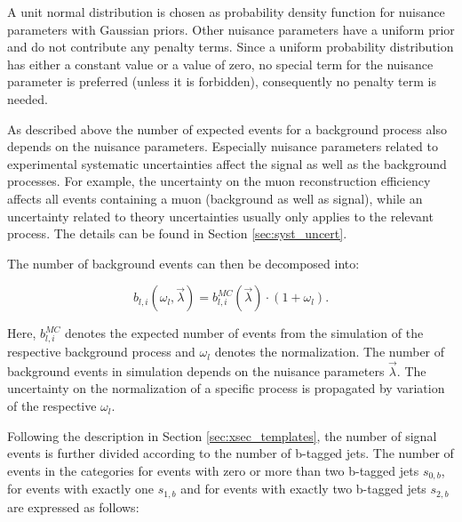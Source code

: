 A unit normal distribution is chosen as probability density function for nuisance parameters with Gaussian priors. Other nuisance parameters have a uniform prior and do not contribute any penalty terms. 
Since a uniform probability distribution has either a constant value or a value of zero, no special term for the nuisance parameter is preferred (unless it is forbidden), consequently no penalty term is needed. 

As described above the number of expected events for a background process also depends on the nuisance parameters. Especially nuisance parameters related to experimental systematic uncertainties affect the signal as well as the background processes. For example, the uncertainty on the muon reconstruction efficiency affects all events containing a muon (background as well as signal), while an uncertainty related to theory uncertainties usually only applies to the relevant process. The details can be found in Section \ref{sec:syst_uncert}.

The number of background events can then be decomposed into:

\begin{equation}
b_{l,i}(\omega_l,\vec{\lambda}) = b_{l,i}^{MC}(\vec{\lambda}) \cdot (1 + \omega_l).
\label{eq:nbli}
\end{equation}

Here, $b_{l,i}^{MC}$ denotes the expected number of events from the simulation of the respective background process and $\omega_l$ denotes the normalization. The number of background events in simulation depends on the nuisance parameters $\vec{\lambda}$. The uncertainty on the normalization of a specific process is propagated
by variation of the respective $\omega_l$.

Following the description in Section \ref{sec:xsec_templates},  the number of signal events is further divided according to the number of b-tagged jets.
The number of events in the categories for events with zero or more than two b-tagged jets $s_{0,b}$, for events with exactly one $s_{1,b}$ and for events with exactly two b-tagged jets $s_{2,b}$ are expressed as follows:

